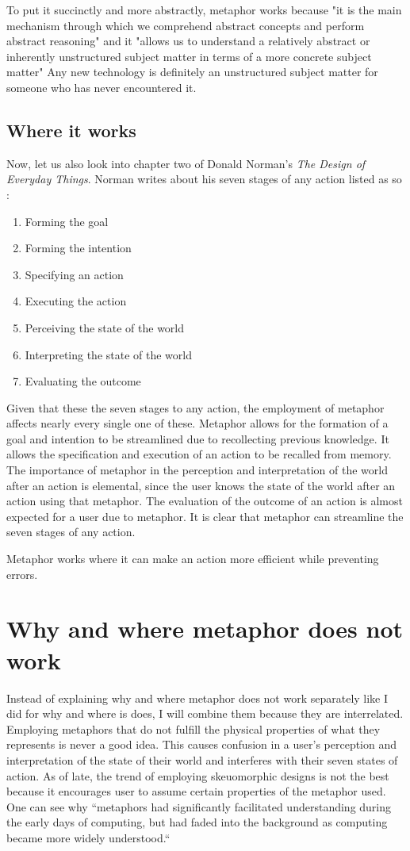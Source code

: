 \documentclass[11pt, oneside]{article}   	%
\begin{document}
To put it succinctly and more abstractly, metaphor works because "it is the main mechanism through which we comprehend abstract concepts and perform abstract reasoning" and it "allows us to understand a relatively abstract or inherently unstructured subject matter in terms of a more concrete subject matter" \cite{metaphor-theory-practice} Any new technology is definitely an unstructured subject matter for someone who has never encountered it.

\subsection{Where it works}
Now, let us also look into chapter two of Donald Norman's \textit{The Design of Everyday Things}. Norman writes about his seven stages of any action listed as so \cite{norman-seven-stages}:
\begin{enumerate}
\item Forming the goal
\item Forming the intention
\item Specifying an action
\item Executing the action
\item Perceiving the state of the world
\item Interpreting the state of the world
\item Evaluating the outcome
\end{enumerate}

Given that these the seven stages to any action, the employment of metaphor affects nearly every single one of these. Metaphor allows for the formation of a goal and intention to be streamlined due to recollecting previous knowledge. It allows the specification and execution of an action to be recalled from memory. The importance of metaphor in the perception and interpretation of the world after an action is elemental, since the user knows the state of the world after an action using that metaphor. The evaluation of the outcome of an action is almost expected for a user due to metaphor. It is clear that metaphor can streamline the seven stages of any action.

Metaphor works where it can make an action more efficient while preventing errors.

\section{Why and where metaphor does not work}
Instead of explaining why and where metaphor does not work separately like I did for why and where is does, I will combine them because they are interrelated. Employing metaphors that do not fulfill the physical properties of what they represents is never a good idea. This causes confusion in a user's perception and interpretation of the state of their world and interferes with their seven states of action. As of late, the trend of employing skeuomorphic designs is not the best because it encourages user to assume certain properties of the metaphor used. One can see why ``metaphors had significantly facilitated understanding during the early days of computing, but had faded into the background as computing became more widely understood.`` \cite{metaphor-theory-practice}
\end{document}
